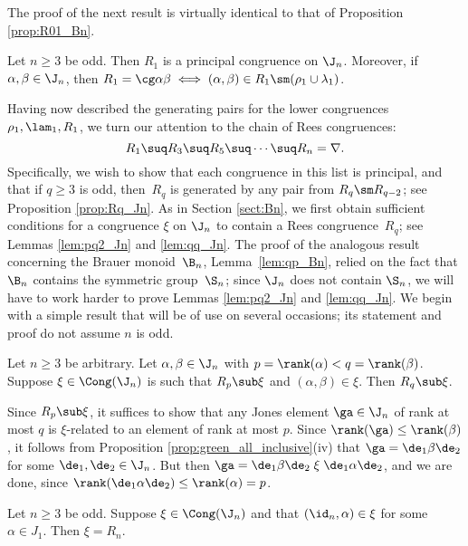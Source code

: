 The proof of the next result is virtually identical to that of Proposition \ref{prop:R01_Bn}.


\begin{prop}\label{prop:R01_Jn}
Let $n\geq3$ be odd.  Then $R_1$ is a principal congruence on $\J_n$.  Moreover, if $\alpha,\beta\in\J_n$, then $R_1=\cg\alpha\beta\iff(\alpha,\beta)\in R_1\sm(\rho_1\cup\lambda_1)$.  \epfres
\end{prop}




Having now described the generating pairs for the lower congruences $\rho_1,\lam_1,R_1$, we turn our attention to the chain of Rees congruences:
\[
R_1\suq R_3\suq R_5\suq\cdots\suq R_n=\nabla.
\]
Specifically, we wish to show that each congruence in this list is principal, and that if $q\geq3$ is odd, then~$R_q$ is generated by any pair from $R_q\sm R_{q-2}$; see Proposition \ref{prop:Rq_Jn}.
%
As in Section \ref{sect:Bn}, we first obtain sufficient conditions for a congruence $\xi$ on $\J_n$ to contain a Rees congruence~$R_q$; see Lemmas \ref{lem:pq2_Jn} and \ref{lem:qq_Jn}.
%
The proof of the analogous result concerning the Brauer monoid~$\B_n$, Lemma~\ref{lem:qp_Bn}, relied on the fact that $\B_n$ contains the symmetric group~$\S_n$; since $\J_n$ does not contain $\S_n$, we will have to work harder to prove Lemmas \ref{lem:pq2_Jn} and \ref{lem:qq_Jn}.
%
We begin with a simple result that will be of use on several occasions; its statement and proof do not assume $n$ is odd.



\begin{lemma}\label{lem:pq_Jn}
Let $n\geq3$ be arbitrary.  Let $\alpha,\beta\in\J_n$ with $p=\rank(\alpha)<q=\rank(\beta)$.  Suppose ${\xi\in\Cong(\J_n)}$ is such that $R_p\sub\xi$ and $(\alpha,\beta)\in\xi$.  Then $R_q\sub\xi$.
\end{lemma}

\pf Since $R_p\sub\xi$, it suffices to show that any Jones element $\ga\in\J_n$ of rank at most $q$ is $\xi$-related to an element of rank at most $p$.  Since $\rank(\ga)\leq\rank(\beta)$, it follows from Proposition \ref{prop:green_all_inclusive}(iv) that $\ga=\de_1\beta\de_2$ for some $\de_1,\de_2\in\J_n$.  But then $\ga=\de_1\beta\de_2 \mathrel\xi \de_1\alpha\de_2$, and we are done, since $\rank(\de_1\alpha\de_2)\leq\rank(\alpha)=p$. \epf


%
\begin{lemma}
\label{lem:1z_Jn}
Let $n\geq3$ be odd.  Suppose $\xi\in\Cong(\J_n)$ and that $(\id_n,\alpha)\in\xi$ for some $\alpha\in J_1$.  Then $\xi=R_n$.
\end{lemma}


